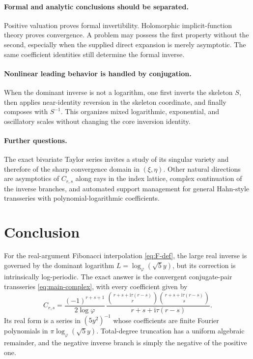 \documentclass[11pt,oneside]{article}
\numberwithin{equation}{section}
\newcommand{\ii}{\mathrm{i}}
\begin{document}
\paragraph{Formal and analytic conclusions should be separated.}
Positive valuation proves formal invertibility.  Holomorphic implicit-function
theory proves convergence.  A problem may possess the first property without
the second, especially when the supplied direct expansion is merely asymptotic.
The same coefficient identities still determine the formal inverse.

\paragraph{Nonlinear leading behavior is handled by conjugation.}
When the dominant inverse is not a logarithm, one first inverts the skeleton
\(S\), then applies near-identity reversion in the skeleton coordinate, and
finally composes with \(S^{-1}\).  This organizes mixed logarithmic,
exponential, and oscillatory scales without changing the core inversion
identity.

\paragraph{Further questions.}
The exact bivariate Taylor series invites a study of its singular variety and
therefore of the sharp convergence domain in \((\xi,\eta)\).  Other natural
directions are asymptotics of \(C_{r,s}\) along rays in the index lattice,
complex continuation of the inverse branches, and automated support management
for general Hahn-style transseries with polynomial-logarithmic coefficients.

\section{Conclusion}
\label{sec:conclusion}

For the real-argument Fibonacci interpolation \cref{eq:F-def}, the large real
inverse is governed by the dominant logarithm
\(L=\log_\varphi(\sqrt5y)\), but its correction is intrinsically
log-periodic.  The exact answer is the convergent conjugate-pair transseries
\cref{eq:main-complex}, with every coefficient given by
\begin{equation*}
  C_{r,s}=\frac{(-1)^{r+s+1}}{2\log\varphi}\,
  \frac{\binom{r+s+\ii\tau(r-s)}r
        \binom{r+s+\ii\tau(r-s)}s}
       {r+s+\ii\tau(r-s)}.
\end{equation*}
Its real form is a series in \((5y^2)^{-1}\) whose coefficients are finite
Fourier polynomials in \(\pi\log_\varphi(\sqrt5y)\).  Total-degree truncation
has a uniform algebraic remainder, and the negative inverse branch is simply
the negative of the positive one.
\end{document}
